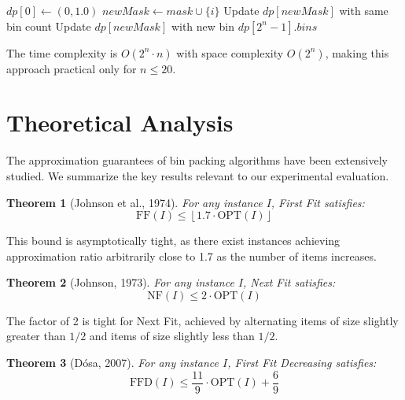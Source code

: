 \documentclass[11pt,a4paper]{article}
\newtheorem{theorem}{Theorem}
\begin{document}
\begin{algorithm}[H]
\caption{Optimal Bitmask DP}
\begin{algorithmic}[1]
\STATE $dp[0] \gets (0, 1.0)$ 
            \STATE $newMask \gets mask \cup \{i\}$
                \STATE Update $dp[newMask]$ with same bin count
            \ELSE
                \STATE Update $dp[newMask]$ with new bin
            \ENDIF
        \ENDFOR
    \ENDIF
\ENDFOR
\RETURN $dp[2^n - 1].bins$
\end{algorithmic}
\end{algorithm}

The time complexity is $O(2^n \cdot n)$ with space complexity $O(2^n)$, making this approach practical only for $n \leq 20$.

\section{Theoretical Analysis}

The approximation guarantees of bin packing algorithms have been extensively studied. We summarize the key results relevant to our experimental evaluation.

\begin{theorem}[Johnson et al., 1974]
For any instance $I$, First Fit satisfies:
\begin{equation}
\text{FF}(I) \leq \left\lfloor 1.7 \cdot \text{OPT}(I) \right\rfloor
\end{equation}
\end{theorem}

This bound is asymptotically tight, as there exist instances achieving approximation ratio arbitrarily close to 1.7 as the number of items increases.

\begin{theorem}[Johnson, 1973]
For any instance $I$, Next Fit satisfies:
\begin{equation}
\text{NF}(I) \leq 2 \cdot \text{OPT}(I)
\end{equation}
\end{theorem}

The factor of 2 is tight for Next Fit, achieved by alternating items of size slightly greater than $1/2$ and items of size slightly less than $1/2$.

\begin{theorem}[Dósa, 2007]
For any instance $I$, First Fit Decreasing satisfies:
\begin{equation}
\text{FFD}(I) \leq \frac{11}{9} \cdot \text{OPT}(I) + \frac{6}{9}
\end{equation}
\end{theorem}
\end{document}
